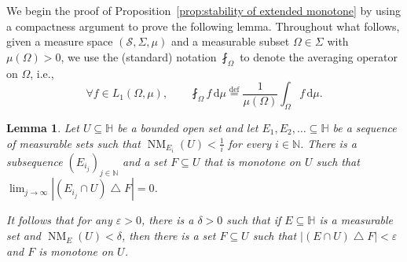 \documentclass[11pt,reqno]{amsart}
\renewcommand{\H}{\mathbb{H}}
\newcommand{\N}{\mathbb{N}}
\renewcommand{\epsilon}{\varepsilon}
\newcommand{\ud}[0]{\,\mathrm{d}}
\newcommand{\0}{\mathbf{0}}
\renewcommand{\1}{\mathbf 1}
\newcommand{\symdiff}{\mathbin{\triangle}}
\renewcommand{\subset}{\subseteq}
\newcommand{\eqdef}{\stackrel{\mathrm{def}}{=}}
\newtheorem{lemma}[thm]{Lemma}
\theoremstyle{remark}
\DeclareMathOperator{\NM}{NM}
\begin{document}
We begin the proof of Proposition~\ref{prop:stability of extended monotone} by using a compactness argument to prove the following lemma. Throughout what follows, given a measure space $(\mathscr{S},\Sigma,\mu)$ and a measurable subset $\Omega\in \Sigma$ with $\mu(\Omega)>0$, we use the (standard) notation $\fint_\Omega$ to denote the averaging operator on $\Omega$, i.e.,
$$
\forall f\in L_1(\Omega,\mu),\qquad  \fint_\Omega f\ud\mu \eqdef \frac{1}{\mu(\Omega)}\int_\Omega f\ud \mu.
$$
\begin{lemma}\label{lem:stability locally monotone}
  Let $U\subset \H$ be a bounded open set and let $E_1,E_2,\dots \subset \H$ be a sequence of measurable sets such that $\NM_{E_i}(U)<\frac{1}{i}$ for every $i\in \N$.  There is a subsequence $(E_{i_j})_{j\in \N}$ and a set $F\subset U$ that is monotone on $U$ such that $\lim_{j\to \infty}\left|(E_{i_j}\cap U)\symdiff F\right|= 0$.

  It follows that for any $\epsilon>0$, there is a $\delta>0$ such that if $E\subset \H$ is a measurable set and $\NM_{E}(U)<\delta$, then there is a set $F\subset U$ such that $|(E\cap U)\symdiff F|<\epsilon$ and $F$ is monotone on $U$.
\end{lemma}
\end{document}
